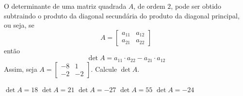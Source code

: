 O determinante de uma matriz quadrada $A$, de ordem $2$, pode ser obtido subtraindo o produto da diagonal secundária do produto da diagonal principal, ou seja, se
\[A = \left[ \begin{array}{cc}
a_{11}  &   a_{12}\\
a_{21}   & a_{22}
\end{array} \right]\]
então
\[\det A=a_{11}\cdot a_{22}-a_{21}\cdot a_{12}\]
Assim, seja $A = \left[ \begin{array}{cc}
-8  &   1\\
-2   & -2
\end{array} \right]$. Calcule $\det A$.

$\det A=18$
$\det A=21$
$\det A=-27$
$\det A=55$
$\det A=-24$



